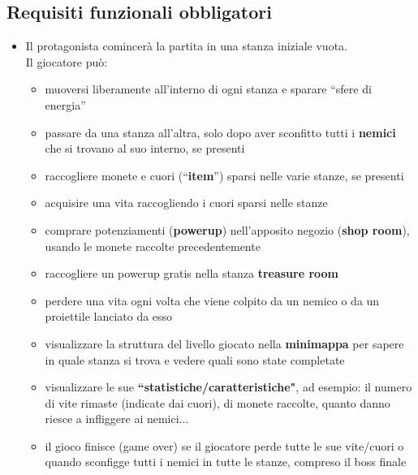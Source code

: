 \documentclass[a4paper,12pt]{report}
\begin{document}
\subsection*{Requisiti funzionali obbligatori}
\begin{itemize}
    \item Il protagonista comincerà la partita in una stanza iniziale vuota.
    \\Il giocatore può:
    \begin{itemize}
        \item muoversi liberamente all'interno di ogni stanza e sparare ``sfere di energia''
        \item passare da una stanza all'altra, solo dopo aver sconfitto tutti i \textbf{nemici} che si trovano al suo interno, se presenti
        \item raccogliere monete e cuori (``\textbf{item}'') sparsi nelle varie stanze, se presenti
        \item acquisire una vita raccogliendo i cuori sparsi nelle stanze
        \item comprare potenziamenti (\textbf{powerup}) nell'apposito negozio (\textbf{shop room}), usando le monete raccolte precedentemente
        \item raccogliere un powerup gratis nella stanza \textbf{treasure room}
        \item perdere una vita ogni volta che viene colpito da un nemico o da un proiettile lanciato da esso
        \item visualizzare la struttura del livello giocato nella \textbf{minimappa} per sapere in quale stanza si trova e vedere quali sono state completate
        \item visualizzare le sue \textbf{``statistiche/caratteristiche"}, ad esempio: il numero di vite rimaste (indicate dai cuori), di monete raccolte, quanto danno riesce a infliggere ai nemici...
        \item il gioco finisce (game over) se il giocatore perde tutte le sue vite/cuori o quando sconfigge tutti i nemici in tutte le stanze, compreso il boss finale
    \end{itemize}
    

\end{itemize}
\end{document}

